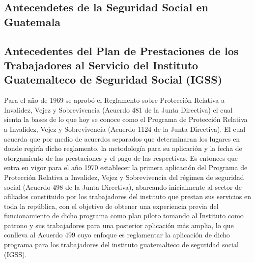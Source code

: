 \documentclass[12pt,letterpaper,titlepage]{article}
\begin{document}
{\subsection{Antecendetes de la Seguridad Social en Guatemala}



\subsection{Antecedentes del Plan de Prestaciones de los Trabajadores al Servicio del Instituto Guatemalteco de Seguridad Social (IGSS)}

Para el año de 1969 se aprobó el Reglamento sobre Protección Relativa a Invalidez, Vejez y Sobrevivencia (Acuerdo 481 de la Junta Directiva) el cual sienta la bases de lo que hoy se conoce como el Programa de Protección Relativa a Invalidez, Vejez y Sobrevivencia (Acuerdo 1124 de la Junta Directiva). El cual acuerda que por medio de acuerdos separados que determinaran los lugares en donde regiría dicho reglamento, la metodología para su aplicación y la fecha de otorgamiento de las prestaciones y el pago de las respectivas. Es entonces que entra en vigor para el año 1970 establecer la primera aplicación del Programa de Protección Relativa a Invalidez, Vejez y Sobrevivencia del régimen de seguridad social (Acuerdo 498 de la Junta Directiva), abarcando inicialmente al sector de afiliados constituido por los trabajadores del instituto que prestan sus servicios en toda la república, con el objetivo de obtener una experiencia previa del funcionamiento de dicho programa como plan piloto tomando al Instituto como patrono y sus trabajadores para una posterior aplicación más amplia, lo que conlleva al Acuerdo 499 cuyo enfoque es reglamentar la aplicación de dicho programa para los trabajadores del instituto guatemalteco de seguridad social (IGSS).\\


}
\end{document}
